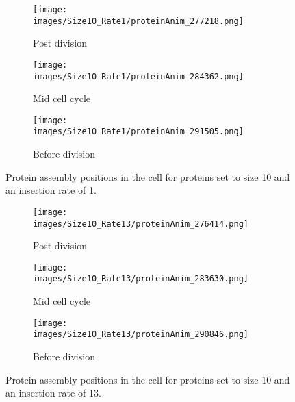 \begin{figure}[h]
    \centering
    \begin{subfigure}[b]{\textwidth}
        \centering
        \texttt{[image: images/Size10\_Rate1/proteinAnim\_277218.png]}
        \caption{Post division}
        \label{10_1_post}
    \end{subfigure}
    \vfill
    \begin{subfigure}[b]{\textwidth}
        \centering
        \texttt{[image: images/Size10\_Rate1/proteinAnim\_284362.png]}
        \caption{Mid cell cycle}
        \label{10_1_mid}
    \end{subfigure}
    \vfill
    \begin{subfigure}[b]{\textwidth}
        \centering
        \texttt{[image: images/Size10\_Rate1/proteinAnim\_291505.png]}
        \caption{Before division}
        \label{10_1_pre}
    \end{subfigure}
    \caption{
    Protein assembly positions in the cell for proteins set to size 10 and an insertion rate of 1.
    }
    \label{10_1_cellcycle}
\end{figure}

\begin{figure}[h]
    \centering
    \begin{subfigure}[b]{\textwidth}
        \centering
        \texttt{[image: images/Size10\_Rate13/proteinAnim\_276414.png]}
        \caption{Post division}
        \label{10_13_post}
    \end{subfigure}
    \vfill
    \begin{subfigure}[b]{\textwidth}
        \centering
        \texttt{[image: images/Size10\_Rate13/proteinAnim\_283630.png]}
        \caption{Mid cell cycle}
        \label{10_13_mid}
    \end{subfigure}
    \vfill
    \begin{subfigure}[b]{\textwidth}
        \centering
        \texttt{[image: images/Size10\_Rate13/proteinAnim\_290846.png]}
        \caption{Before division}
        \label{10_13_pre}
    \end{subfigure}
    \caption{
    Protein assembly positions in the cell for proteins set to size 10 and an insertion rate of 13.
    }
    \label{10_13_cellcycle}
\end{figure}


